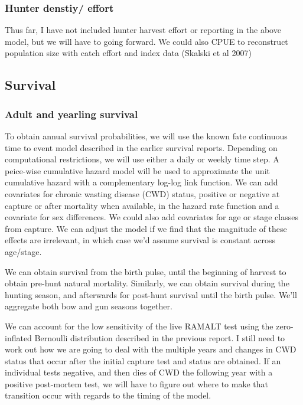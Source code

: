 \documentclass[12pt]{article}\usepackage[]{graphicx}\usepackage[]{color}
\begin{document}
\subsubsection{Hunter denstiy/ effort}
Thus far, I have not included hunter harvest effort or reporting in the above model, but we will have to going forward.
We could also CPUE to reconstruct population size with catch effort and index data (Skalski et al 2007)

\subsection{Survival}
\subsubsection{Adult and yearling survival}

To obtain annual survival probabilities, we will use the known fate continuous time to event model described in the earlier survival reports. Depending on computational restrictions, we will use either a daily or weekly time step. A peice-wise cumulative hazard model will be used to approximate the unit cumulative hazard with a complementary log-log link function. We can add covariates for chronic wasting disease (CWD) status, positive or negative at capture or after mortality when available, in the hazard rate function and a covariate for sex differences. We could also add covariates for age or stage classes from capture. We can adjust the model if we find that the magnitude of these effects are irrelevant, in which case we'd assume survival is constant across age/stage.

We can obtain survival from the birth pulse, until the beginning of harvest to obtain pre-hunt natural mortality. Similarly, we can obtain survival during the hunting season, and afterwards for post-hunt survival until the birth pulse. We'll aggregate both bow and gun seasons together.

We can account for the low sensitivity of the live RAMALT test using the zero-inflated Bernoulli distribution described in the previous report. I still need to work out how we are going to deal with the multiple years and changes in CWD status that occur after the initial capture test and status are obtained. If an individual tests negative, and then dies of CWD the following year with a positive post-mortem test, we will have to figure out where to make that transition occur with regards to the timing of the model.
\end{document}
